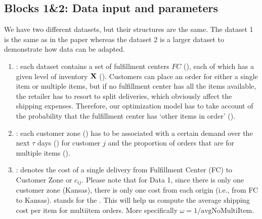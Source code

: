 \documentclass[letterpaper,10pt,english]{jupyterBook}
\begin{document}
\begin{sphinxVerbatim}[commandchars=\\\{\}]
   
  
\end{sphinxVerbatim}


\subsection{Blocks 1\&2: Data input and parameters}
\label{\detokenize{docs/Case2_1_Module1_Online_Fulfillment_Script:blocks-1-2-data-input-and-parameters}}
\sphinxAtStartPar
We have two different datasets, but their structures are the same. The dataset 1 is the same as in the paper whereas the dataset 2 is a larger dataset to demonstrate how data can be adapted.
\begin{enumerate}
%
\item {} 
\sphinxAtStartPar
{}: each dataset contains a set of fulfillment centers \(FC\) (), each of which has a given level of inventory \({\bf X}\) (). Customers can place an order for either a single item or multiple items, but if no fulfillment center has all the items available, the retailer has to resort to split deliveries, which obviously affect the shipping expenses. Therefore, our optimization model has to take account of the probability that the fulfillment center has ‘other items in order’ ().

\item {} 
\sphinxAtStartPar
{}: each customer zone () has to be associated with a certain demand over the next \(\tau\) days () for customer \(j\) and the proportion of orders that are for multiple items ().

\item {} 
\sphinxAtStartPar
{}:  denotes the cost of a single delivery from Fulfillment Center (FC)  to Customer Zone  or \(c_{ij}\). Please note that for Data 1, since there is only one customer zone (Kansas), there is only one cost from each origin (i.e., from FC  to Kansas).  stands for the . This will help us compute the average shipping cost per item for multi\sphinxhyphen{}item orders. More specifically \(\omega = 1/\mbox{avgNoMultiItem}\).

\end{enumerate}
\end{document}
